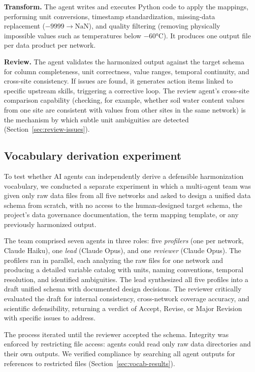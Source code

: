 \documentclass[review,authoryear]{elsarticle}
\begin{document}
\textbf{Transform.} The agent writes and executes Python code to apply the mappings, performing unit conversions, timestamp standardization, missing-data replacement ($-9999 \to \text{NaN}$), and quality filtering (removing physically impossible values such as temperatures below $-60$\si{\degreeCelsius}). It produces one output file per data product per network.

\textbf{Review.} The agent validates the harmonized output against the target schema for column completeness, unit correctness, value ranges, temporal continuity, and cross-site consistency. If issues are found, it generates action items linked to specific upstream skills, triggering a corrective loop. The review agent's cross-site comparison capability (checking, for example, whether soil water content values from one site are consistent with values from other sites in the same network) is the mechanism by which subtle unit ambiguities are detected (Section~\ref{sec:review-issues}).

\subsection{Vocabulary derivation experiment}
\label{sec:vocab-experiment}

To test whether AI agents can independently derive a defensible harmonization vocabulary, we conducted a separate experiment in which a multi-agent team was given only raw data files from all five networks and asked to design a unified data schema from scratch, with no access to the human-designed target schema, the project's data governance documentation, the term mapping template, or any previously harmonized output.

The team comprised seven agents in three roles: five \emph{profilers} (one per network, Claude Haiku), one \emph{lead} (Claude Opus), and one \emph{reviewer} (Claude Opus). The profilers ran in parallel, each analyzing the raw files for one network and producing a detailed variable catalog with units, naming conventions, temporal resolution, and identified ambiguities. The lead synthesized all five profiles into a draft unified schema with documented design decisions. The reviewer critically evaluated the draft for internal consistency, cross-network coverage accuracy, and scientific defensibility, returning a verdict of Accept, Revise, or Major Revision with specific issues to address.

The process iterated until the reviewer accepted the schema. Integrity was enforced by restricting file access: agents could read only raw data directories and their own outputs. We verified compliance by searching all agent outputs for references to restricted files (Section~\ref{sec:vocab-results}).
\end{document}
